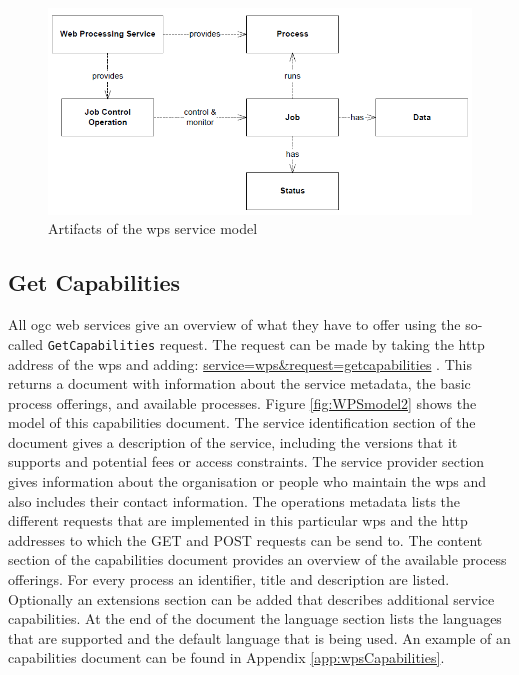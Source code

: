 \begin{figure}
	\centering
	\includegraphics[width=1\linewidth]{UML/WPSmodel.png}
	\caption{Artifacts of the \ac{wps} service model \citep[p. 15]{GEO:OGC}}
	\label{fig:WPSmodel}
\end{figure}

\subsection{Get Capabilities}
\begin{sloppypar}
	All \ac{ogc} web services give an overview of what they have to offer using the so-called \texttt{GetCapabilities} request. The request can be made by taking the \ac{http} address of the \ac{wps} and adding: \url{service=wps&request=getcapabilities} . This returns a document with information about the service metadata, the basic process offerings, and available processes. Figure \ref{fig:WPSmodel2} shows the model of this capabilities document. The service identification section of the document gives a description of the service, including the versions that it supports and potential fees or access constraints. The service provider section gives information about the organisation or people who maintain the \ac{wps} and also includes their contact information. The operations metadata lists the different requests that are implemented in this particular \ac{wps} and the \ac{http} addresses to which the GET and POST requests can be send to. The content section of the capabilities document provides an overview of the available process offerings. For every process an identifier, title and description are listed. Optionally an extensions section can be added that describes additional service capabilities. At the end of the document the language section lists the languages that are supported and the default language that is being used. An example of an capabilities document can be found in Appendix \ref{app:wpsCapabilities}. 
\end{sloppypar}

